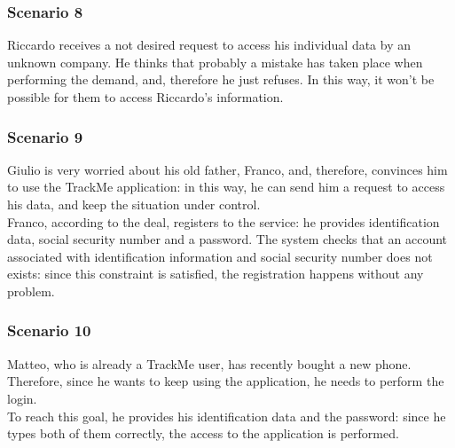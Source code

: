 \subsubsection{Scenario 8}
Riccardo receives a not desired request to access his individual data by an unknown company. 
He thinks that probably a mistake has taken place when performing the demand, and, therefore he just refuses. 
In this way, it won't be possible for them to access Riccardo's information.

\subsubsection{Scenario 9}
Giulio is very worried about his old father, Franco, and, therefore, convinces him to use the TrackMe application: in this way, he can send him a request to access his data, and keep the situation under control. \\
Franco, according to the deal, registers to the service: he provides identification data, social security number and a password. 
The system checks that an account associated with identification information and social security number does not exists: since this constraint is satisfied, the registration happens without any problem.  

\subsubsection{Scenario 10}
Matteo, who is already a TrackMe user, has recently bought a new phone.
Therefore, since he wants to keep using the application, he needs to perform the login.\\
To reach this goal, he provides his identification data and the password: since he types both of them correctly, the access to the application is performed. 
